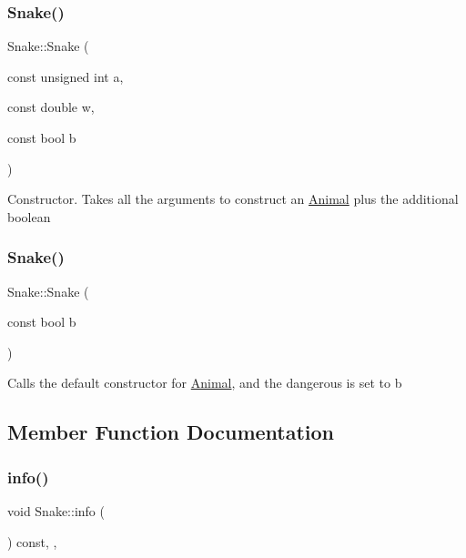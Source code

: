 \subsubsection{\texorpdfstring{Snake()}{Snake()}\hspace{0.1cm}{\footnotesize\ttfamily [1/2]}}
{\footnotesize\ttfamily Snake\+::\+Snake (\begin{DoxyParamCaption}\item[{const unsigned int}]{a,  }\item[{const double}]{w,  }\item[{const bool}]{b }\end{DoxyParamCaption})}

Constructor. Takes all the arguments to construct an \hyperlink{classAnimal}{Animal} plus the additional boolean \mbox{\label{classSnake_a3155ff2573c745c17c8b8ca8b90b5926}} 
\subsubsection{\texorpdfstring{Snake()}{Snake()}\hspace{0.1cm}{\footnotesize\ttfamily [2/2]}}
{\footnotesize\ttfamily Snake\+::\+Snake (\begin{DoxyParamCaption}\item[{const bool}]{b }\end{DoxyParamCaption})\hspace{0.3cm}{\ttfamily [explicit]}}

Calls the default constructor for \hyperlink{classAnimal}{Animal}, and the {\ttfamily dangerous} is set to {\ttfamily b} 

\subsection{Member Function Documentation}
\mbox{\label{classSnake_a502e4a95caef8a4220527a31cc67d8dc}} 
\subsubsection{\texorpdfstring{info()}{info()}}
{\footnotesize\ttfamily void Snake\+::info (\begin{DoxyParamCaption}{ }\end{DoxyParamCaption}) const\hspace{0.3cm}{\ttfamily [override]}, {\ttfamily [virtual]}, {\ttfamily [noexcept]}}


